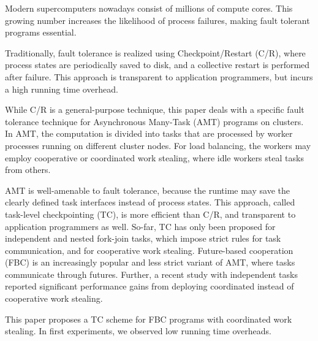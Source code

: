 Modern supercomputers nowadays consist of millions of compute cores. This growing number increases the likelihood of process failures, making fault tolerant programs essential.

Traditionally, fault tolerance is realized using Checkpoint/Restart (C/R), where process states are periodically saved to disk, and a collective restart is performed after failure. This approach is transparent to application programmers, but incurs a high running time overhead.

While C/R is a general-purpose technique, this paper deals with a specific fault tolerance technique for Asynchronous Many-Task (AMT) programs on clusters. In AMT, the computation is divided into tasks that are processed by worker processes running on different cluster nodes. For load balancing, the workers may employ cooperative or coordinated work stealing, where idle workers steal tasks from others.

AMT is well-amenable to fault tolerance, because the runtime may save the clearly defined task interfaces instead of process states. This approach, called task-level checkpointing (TC), is more efficient than C/R, and transparent to application programmers as well. So-far, TC has only been proposed for independent and nested fork-join tasks, which impose strict rules for task communication, and for cooperative work stealing. Future-based cooperation (FBC) is an increasingly popular and less strict variant of AMT, where tasks communicate through futures. Further, a recent study with independent tasks reported significant performance gains from deploying coordinated instead of cooperative work stealing.

This paper proposes a TC scheme for FBC programs with coordinated work stealing. In first experiments, we observed low running time overheads.
